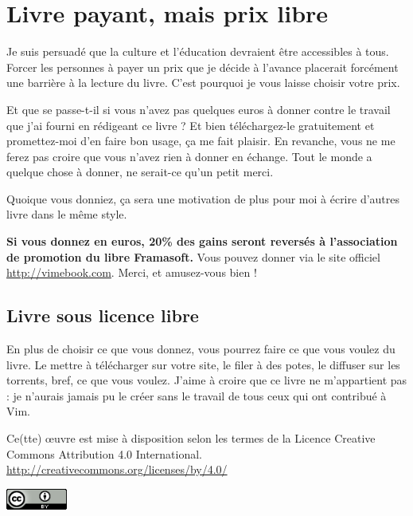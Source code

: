 
\chapter*{Livre payant, mais prix libre}

 Je suis persuadé que la culture et l'éducation devraient être accessibles à tous. Forcer les personnes à payer un prix que je décide à l'avance placerait forcément une barrière à la lecture du livre. C'est pourquoi je vous laisse choisir votre prix.

Et que se passe-t-il si vous n'avez pas quelques euros à donner contre le travail que j'ai fourni en rédigeant ce livre ? Et bien téléchargez-le gratuitement et promettez-moi d'en faire bon usage, ça me fait plaisir. En revanche, vous ne me ferez pas croire que vous n'avez rien à donner en échange. Tout le monde a quelque chose à donner, ne serait-ce qu'un petit merci.

Quoique vous donniez, ça sera une motivation de plus pour moi à écrire d'autres livre dans le même style.

\textbf{Si vous donnez en euros, 20\% des gains seront reversés à l'association de promotion du libre Framasoft.} Vous pouvez donner via le site officiel \url{http://vimebook.com}. Merci, et amusez-vous bien !

\section{Livre sous licence libre}

En plus de choisir ce que vous donnez, vous pourrez faire ce que vous voulez du livre. Le mettre à télécharger sur votre site, le filer à des potes, le diffuser sur les torrents, bref, ce que vous voulez. J'aime à croire que ce livre ne m'appartient pas : je n'aurais jamais pu le créer sans le travail de tous ceux qui ont contribué à Vim.

Ce(tte) œuvre est mise à disposition selon les termes de la Licence Creative Commons Attribution 4.0 International.
\url{http://creativecommons.org/licenses/by/4.0/}

\includegraphics[width=2cm]{graphics/cc88x31.png}

